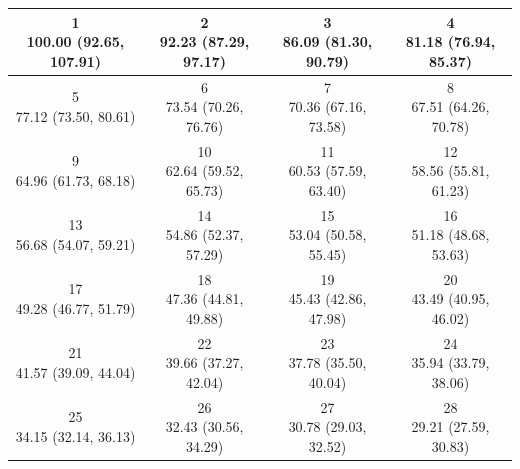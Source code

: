 \begin{table}[htbp]
\centering
\scriptsize
\begin{tabular}{cccc}
\hline
\shortstack[c]{1\\100.00 (92.65, 107.91)} & \shortstack[c]{2\\92.23 (87.29, 97.17)} & \shortstack[c]{3\\86.09 (81.30, 90.79)} & \shortstack[c]{4\\81.18 (76.94, 85.37)} \\
\hline
\shortstack[c]{5\\77.12 (73.50, 80.61)} & \shortstack[c]{6\\73.54 (70.26, 76.76)} & \shortstack[c]{7\\70.36 (67.16, 73.58)} & \shortstack[c]{8\\67.51 (64.26, 70.78)} \\
\hline
\shortstack[c]{9\\64.96 (61.73, 68.18)} & \shortstack[c]{10\\62.64 (59.52, 65.73)} & \shortstack[c]{11\\60.53 (57.59, 63.40)} & \shortstack[c]{12\\58.56 (55.81, 61.23)} \\
\hline
\shortstack[c]{13\\56.68 (54.07, 59.21)} & \shortstack[c]{14\\54.86 (52.37, 57.29)} & \shortstack[c]{15\\53.04 (50.58, 55.45)} & \shortstack[c]{16\\51.18 (48.68, 53.63)} \\
\hline
\shortstack[c]{17\\49.28 (46.77, 51.79)} & \shortstack[c]{18\\47.36 (44.81, 49.88)} & \shortstack[c]{19\\45.43 (42.86, 47.98)} & \shortstack[c]{20\\43.49 (40.95, 46.02)} \\
\hline
\shortstack[c]{21\\41.57 (39.09, 44.04)} & \shortstack[c]{22\\39.66 (37.27, 42.04)} & \shortstack[c]{23\\37.78 (35.50, 40.04)} & \shortstack[c]{24\\35.94 (33.79, 38.06)} \\
\hline
\shortstack[c]{25\\34.15 (32.14, 36.13)} & \shortstack[c]{26\\32.43 (30.56, 34.29)} & \shortstack[c]{27\\30.78 (29.03, 32.52)} & \shortstack[c]{28\\29.21 (27.59, 30.83)} \\

\end{tabular}
\end{table}
